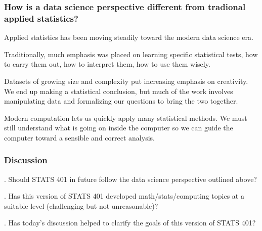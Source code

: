 \documentclass{beamer}
\begin{document}

\begin{frame}
\frametitle{How is a data science perspective different from tradional applied statistics?}

\begin{myitemize}
\item Applied statistics has been moving steadily toward the modern data science era.

\item Traditionally, much emphasis was placed on learning specific statistical tests, how to carry them out, how to interpret them, how to use them wisely.

\item Datasets of growing size and complexity put increasing emphasis on creativity. We end up making a statistical conclusion, but much of the work involves manipulating data and formalizing our questions to bring the two together.

\item Modern computation lets us quickly apply many statistical methods. We must still understand what is going on inside the computer so we can guide the computer toward a sensible and correct analysis.

\end{myitemize}

\end{frame}

\begin{frame}
  \frametitle{Discussion}
  . Should STATS 401 in future follow the data science perspective outlined above?

  \vspace{15mm}

   . Has this version of STATS 401 developed math/stats/computing topics at a suitable level (challenging but not unreasonable)?

  \vspace{15mm}
  
   . Has today's discussion helped to clarify the goals of this version of STATS 401?

  \vspace{15mm}

\end{frame}
\end{document}
